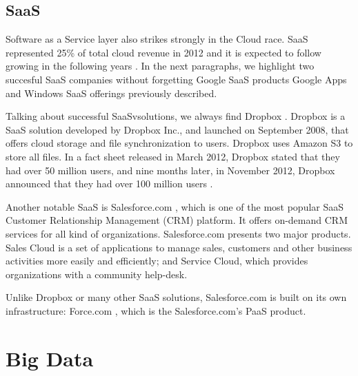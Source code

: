 \subsection{SaaS}
Software as a Service layer also strikes strongly in the Cloud race. SaaS represented 25\% of total cloud revenue in 2012 and it is expected to follow growing in the following years \cite{aslett2013451}. In the next paragraphs, we highlight two succesful SaaS companies without forgetting Google SaaS products Google Apps and Windows SaaS offerings previously described.
\par
Talking about successful SaaSvsolutions, we always find Dropbox \cite{Dropbox}. Dropbox is a SaaS solution developed by Dropbox Inc., and launched on September 2008, that offers cloud storage and file synchronization to users. Dropbox uses Amazon S3 to store all files. 
In a fact sheet \cite{Dropbox:sheet} released in March 2012, Dropbox stated that they had over 50 million users, and nine months later, in November 2012, Dropbox announced that they had over 100 million users \cite{Dropbox:thanks}.
\par
Another notable SaaS is Salesforce.com \cite{Salesforce.com}, which is one of the most popular SaaS Customer Relationship Management (CRM) platform. It offers on-demand CRM services for all kind of organizations. Salesforce.com presents two major products. Sales Cloud is a set of applications to manage sales, customers and other business activities more easily and efficiently; and Service Cloud, which provides organizations with a community help-desk.
\par
Unlike Dropbox or many other SaaS solutions, Salesforce.com is built on its own infrastructure: Force.com \cite{Force.com}, which is the Salesforce.com's PaaS product.


\section{Big Data}


